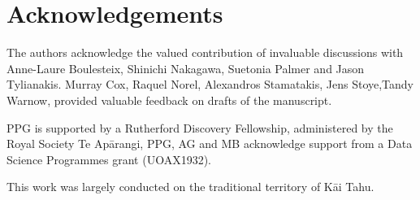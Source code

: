\documentclass[fleqn,10pt]{SelfArx} %
\begin{document}
\section*{Acknowledgements}

The authors acknowledge the valued contribution of invaluable
discussions with Anne-Laure Boulesteix, Shinichi Nakagawa, Suetonia
Palmer and Jason Tylianakis. Murray Cox, Raquel
Norel, Alexandros Stamatakis, Jens Stoye,Tandy Warnow, provided
valuable feedback on drafts of the manuscript.

PPG is supported by a Rutherford Discovery Fellowship,
administered by the Royal Society Te Ap\=arangi, 
PPG, AG and MB acknowledge support from a Data Science Programmes grant
(UOAX1932).

This work was largely conducted on the traditional territory of K\=ai Tahu.




\end{document}
